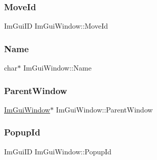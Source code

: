 \hypertarget{struct_im_gui_window_a680ac2168da85f59c35de8f0813224d6}{}\label{struct_im_gui_window_a680ac2168da85f59c35de8f0813224d6} 
\subsubsection{\texorpdfstring{Move\+Id}{MoveId}}
{\footnotesize\ttfamily Im\+Gui\+ID Im\+Gui\+Window\+::\+Move\+Id}

\hypertarget{struct_im_gui_window_ab44252eb7d02d3f38249f5bac605037c}{}\label{struct_im_gui_window_ab44252eb7d02d3f38249f5bac605037c} 
\subsubsection{\texorpdfstring{Name}{Name}}
{\footnotesize\ttfamily char$\ast$ Im\+Gui\+Window\+::\+Name}

\hypertarget{struct_im_gui_window_a5f0b37cb12fbeb3efe00d0cd826d5d65}{}\label{struct_im_gui_window_a5f0b37cb12fbeb3efe00d0cd826d5d65} 
\subsubsection{\texorpdfstring{Parent\+Window}{ParentWindow}}
{\footnotesize\ttfamily \hyperlink{struct_im_gui_window}{Im\+Gui\+Window}$\ast$ Im\+Gui\+Window\+::\+Parent\+Window}

\hypertarget{struct_im_gui_window_a319c5f43fa4ee9c76b8a6e551e0c0869}{}\label{struct_im_gui_window_a319c5f43fa4ee9c76b8a6e551e0c0869} 
\subsubsection{\texorpdfstring{Popup\+Id}{PopupId}}
{\footnotesize\ttfamily Im\+Gui\+ID Im\+Gui\+Window\+::\+Popup\+Id}

\hypertarget{struct_im_gui_window_a1453f685401a44f76256fb54a4aac451}{}\label{struct_im_gui_window_a1453f685401a44f76256fb54a4aac451} 
